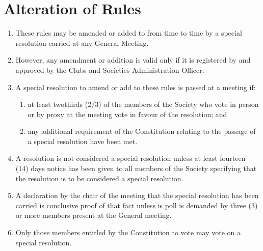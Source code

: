 \documentclass[a4paper]{article}
\newcommand*{\sectionr}[1]{{\raggedright \section{#1}}}
\begin{document}
\sectionr{Alteration of Rules}
\begin{enumerate}
\item These rules may be amended or added to from time to time by a special resolution carried at any General Meeting.
\item However, any amendment or addition is valid only if it is registered by and approved by the Clubs and Societies Administration Officer.
\item A special resolution to amend or add to these rules is passed at a meeting if:
	\begin{enumerate}
	\item at least two\textendash thirds (2/3) of the members of the Society who vote in person or by proxy at the meeting vote in favour of the resolution; and
	\item any additional requirement of the Constitution relating to the passage of a special resolution have been met.
	\end{enumerate}
\item A resolution is not considered a special resolution unless at least fourteen (14) days notice has been given to all members of the Society specifying that the resolution is to be considered a special resolution.
\item A declaration by the chair of the meeting that the special resolution has been carried is conclusive proof of that fact unless is poll is demanded by three (3) or more members present at the General meeting.
\item Only those members entitled by the Constitution to vote may vote on a special resolution.
\end{enumerate}
\end{document}

